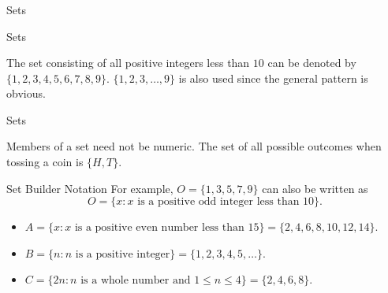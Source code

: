 \begin{frame}[fragile]\frametitle{}
\begin{center}
{\Large Sets}
\end{center}
\end{frame}

\begin{frame}{Sets}
\begin{example}
The set consisting of all positive integers less than $10$ can be denoted by $\{1,2,3,4,5,6,7,8,9\}$.  $\{1,2,3,\ldots,9\}$ is also used since the general pattern is obvious.
\end{example}
\end{frame}


\begin{frame}{Sets}
\begin{example}
Members of a set need not be numeric.  The set of all possible outcomes when tossing a coin is  $\{H,T\}$.
\end{example}
\end{frame}

\begin{frame}{Set Builder Notation}
For example, $O=\{1,3,5,7,9\}$ can also be written as $$O=\{x: x \text{ is a positive odd integer less than } 10\}.$$

\begin{example} 
\begin{itemize}
\item $A=\{x: x \text{ is a positive even number less than }15\}=\{2,4,6,8,10,12,14\}$.
\item $B=\{n: n \text{ is a positive integer}\}=\{1,2,3,4,5,\ldots\}$.
\item $C=\{2n: n \text{ is a whole number and }1\leq n\leq 4\}=\{2,4,6,8\}$.
\end{itemize}
\end{example}
\end{frame}

